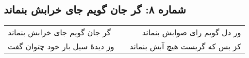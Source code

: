 \begin{center}
\section*{شماره ۸: گر جان گویم جای خرابش بنماند}
\label{sec:008}
\begin{longtable}{l p{0.5cm} r}
گر جان گویم جای خرابش بنماند
&&
ور دل گویم رای صوابش بنماند
\\
وز دیدهٔ سیل بار خود چتوان گفت
&&
کز بس که گریست هیچ آبش بنماند
\\
\end{longtable}
\end{center}
